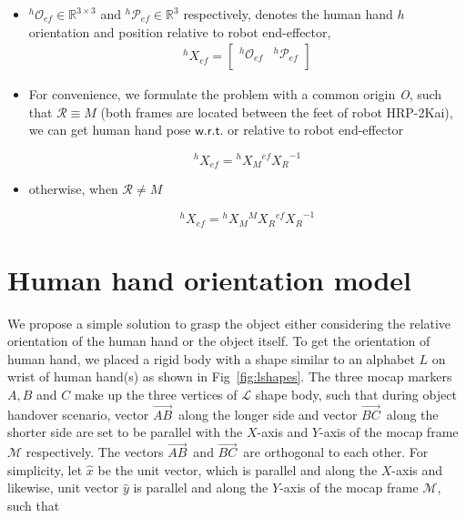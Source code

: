 \begin{itemize}
	\item ${{}^{h}\mathcal{O}_{ef}} \in \mathbb{R}^{3\times3}$ and ${{}^{h}\mathcal{P}_{ef}} \in \mathbb{R}^{3}$ respectively, denotes the human hand $h$ orientation and position relative to robot end-effector,
	\begin{gather}\label{X_ef_h}
	{}^{h}{X}_{ef} =
	\left[\begin{array}{cc}
	{}^{h}\mathcal{O}_{ef} & {}^{h}\mathcal{P}_{ef} \\
	\end{array}\right]
	\end{gather}
	
	\item For convenience, we formulate the problem with a common origin {\it O}, such that $\mathcal R \equiv M$ (both frames are located between the feet of robot HRP-2Kai), we can get human hand pose $\mathsf{w.r.t.}$ or relative to robot end-effector
	
	\begin{equation}\label{X_ef_h1}
	{}^{h}{X}_{ef} = {}^{h}{X}_{M}  {}^{ef}{X_{R}}^{-1}
	\end{equation}
	\item otherwise, when $\mathcal R \neq M$
	
	\begin{equation}\label{X_ef_h2}
	{}^{h}{X}_{ef} = {}^{h}{X}_{M}  {}^{M}{X}_R  {}^{ef}{X_{R}}^{-1}
	\end{equation}
	
\end{itemize}

\clearpage

\section{Human hand orientation model}\label{hand_orientation}

We propose a simple solution to grasp the object either considering the relative orientation of the human hand or the object itself. To get the orientation of human hand, we placed a rigid body with a shape similar to an alphabet $L$ on wrist of human hand(s) as shown in Fig~\ref{fig:lshapes}. The three mocap markers $A, B$ and $C$ make up the three vertices of $\mathcal{L}$ shape body, such that during object handover scenario, vector $\vec{AB}^{\,}$ along the longer side and vector $\vec{BC}^{\,}$ along the shorter side are set to be parallel with the $X$-axis and $Y$-axis of the mocap frame $\mathcal{M}$ respectively. The vectors $\vec{AB}^{\,}$ and $\vec{BC}^{\,}$ are orthogonal to each other. For simplicity, let $\hat{x}$ be the unit vector, which is parallel and along the $X$-axis and likewise, unit vector $\hat{y}$ is parallel and along the $Y$-axis of the mocap frame $\mathcal{M}$, such that


